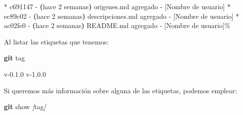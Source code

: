 \documentclass[
]{book}
\newenvironment{Shaded}{\begin{snugshade}}{\end{snugshade}}
\newcommand{\AttributeTok}[1]{\textcolor[rgb]{0.13,0.29,0.53}{#1}}
\newcommand{\ErrorTok}[1]{\textcolor[rgb]{0.64,0.00,0.00}{\textbf{#1}}}
\newcommand{\ExtensionTok}[1]{#1}
\newcommand{\FunctionTok}[1]{\textcolor[rgb]{0.13,0.29,0.53}{\textbf{#1}}}
\newcommand{\KeywordTok}[1]{\textcolor[rgb]{0.13,0.29,0.53}{\textbf{#1}}}
\newcommand{\NormalTok}[1]{#1}
\newcommand{\PreprocessorTok}[1]{\textcolor[rgb]{0.56,0.35,0.01}{\textit{#1}}}
\newcommand{\SpecialStringTok}[1]{\textcolor[rgb]{0.31,0.60,0.02}{#1}}
\begin{document}
\begin{Shaded}
\begin{Highlighting}[]
\ExtensionTok{*}\NormalTok{ c691147 }\AttributeTok{{-}} \ErrorTok{(}\ExtensionTok{hace}\NormalTok{ 2 semanas}\KeywordTok{)} \ExtensionTok{origenes.md}\NormalTok{ agregado }\AttributeTok{{-}}\NormalTok{ [Nombre de usuario]}
\ExtensionTok{*}\NormalTok{ ec89c02 }\AttributeTok{{-}} \ErrorTok{(}\ExtensionTok{hace}\NormalTok{ 2 semanas}\KeywordTok{)} \ExtensionTok{descripciones.md}\NormalTok{ agregado }\AttributeTok{{-}}\NormalTok{ [Nombre de usuario]}
\ExtensionTok{*}\NormalTok{ ac02fe0 }\AttributeTok{{-}} \ErrorTok{(}\ExtensionTok{hace}\NormalTok{ 2 semanas}\KeywordTok{)} \ExtensionTok{README.md}\NormalTok{ agregado }\AttributeTok{{-}}\NormalTok{ [Nombre de usuario]\%       }
\end{Highlighting}
\end{Shaded}

Al listar las etiquetas que tenemos:

\begin{Shaded}
\begin{Highlighting}[]
\FunctionTok{git}\NormalTok{ tag}
\end{Highlighting}
\end{Shaded}

\begin{Shaded}
\begin{Highlighting}[]
\ExtensionTok{v{-}0.1.0}
\ExtensionTok{v{-}1.0.0}
\end{Highlighting}
\end{Shaded}

Si queremos más información sobre alguna de las etiquetas, podemos emplear:

\begin{Shaded}
\begin{Highlighting}[]
\FunctionTok{git}\NormalTok{ show }\PreprocessorTok{[}\SpecialStringTok{tag}\PreprocessorTok{]}
\end{Highlighting}
\end{Shaded}
\end{document}
